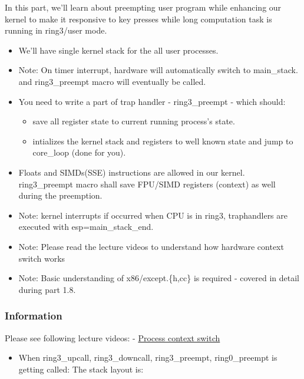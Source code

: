 \documentclass[]{book}
\begin{document}
In this part, we'll learn about preempting user program while enhancing
our kernel to make it responsive to key presses while long computation
task is running in ring3/user mode.

\begin{itemize}
\itemsep1pt\parskip0pt
\item
  We'll have single kernel stack for the all user processes.
\item
  Note: On timer interrupt, hardware will automatically switch to
  main\_stack. and ring3\_preempt macro will eventually be called.
\item
  You need to write a part of trap handler - ring3\_preempt - which
  should:

  \begin{itemize}
  \itemsep1pt\parskip0pt
  \item
    save all register state to current running process's state.
  \item
    intializes the kernel stack and registers to well known state and
    jump to core\_loop (done for you).
  \end{itemize}
\item
  Floats and SIMDs(SSE) instructions are allowed in our kernel.
  ring3\_preempt macro shall save FPU/SIMD registers (context) as well
  during the preemption.
\item
  Note: kernel interrupts if occurred when CPU is in ring3, traphandlers
  are executed with esp=main\_stack\_end.
\item
  Note: Please read the lecture videos to understand how hardware
  context switch works
\item
  Note: Basic understanding of x86/except.\{h,cc\} is required - covered
  in detail during part 1.8.
\end{itemize}

\subsubsection*{Information}\label{information-10}

Please see following lecture videos: - \href{}{Process context switch}

\begin{itemize}
\itemsep1pt\parskip0pt
\item
  When ring3\_upcall, ring3\_downcall, ring3\_preempt, ring0\_preempt is
  getting called: The stack layout is:
\end{itemize}
\end{document}
